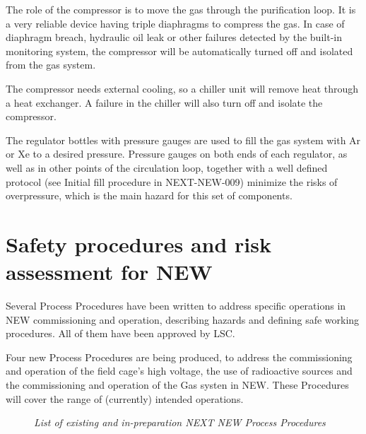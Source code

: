 \documentclass[11pt]{article}
\begin{document}
The role of the compressor is to move the gas through the purification loop. It is a very reliable device having triple diaphragms to compress the gas. 
In case of diaphragm breach, hydraulic oil leak or other failures detected by the built-in monitoring system, the compressor will be automatically turned off and isolated from the gas system. 

The compressor needs external cooling, so a chiller unit will remove heat through a heat exchanger. A failure in the chiller will also turn off and isolate the compressor. 

The regulator bottles with pressure gauges are used to fill the gas system with Ar or Xe to a desired pressure. 
Pressure gauges on both ends of each regulator, as well as in other points of the circulation loop, together with a well defined protocol (see Initial fill procedure in NEXT-NEW-009) minimize the risks of overpressure, which is the main hazard for this set of components. 


\section{Safety procedures and risk assessment for NEW}
Several Process Procedures have been written to address specific operations in NEW commissioning and operation, describing hazards and defining safe working procedures. 
All of them have been approved by LSC.

Four new Process Procedures are being produced, to address the commissioning and operation of the field cage's high voltage, the use of radioactive sources and the commissioning and operation of the Gas systen in NEW. These Procedures will cover the range of (currently) intended operations.

\begin{figure}[ht!]
    \bigskip
    \begin{center}\leavevmode
        \caption{\textit{List of existing and in-preparation NEXT NEW Process Procedures}}
        \label{fig:PROC:PROC}
    \end{center}
\end{figure}
\end{document}
